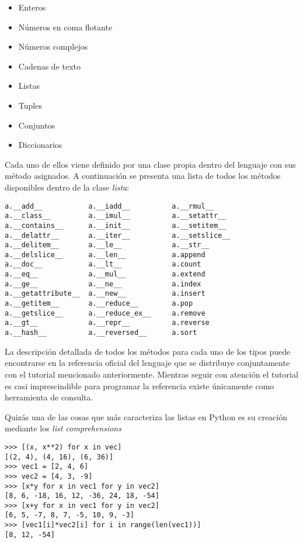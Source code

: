 \documentclass[a4paper,10pt]{article}
\begin{document}
\begin{itemize}
\item Enteros
\item Números en coma flotante
\item Números complejos
\item Cadenas de texto
\item Listas
\item Tuples
\item Conjuntos
\item Diccionarios
\end{itemize}

Cada uno de ellos viene definido por una clase propia dentro del
lenguaje con sus método asignados.  A continuación se presenta una
lista de todos los métodos disponibles dentro de la clase
\emph{lista}:

\begin{lstlisting}
a.__add__           a.__iadd__          a.__rmul__
a.__class__         a.__imul__          a.__setattr__
a.__contains__      a.__init__          a.__setitem__
a.__delattr__       a.__iter__          a.__setslice__
a.__delitem__       a.__le__            a.__str__
a.__delslice__      a.__len__           a.append
a.__doc__           a.__lt__            a.count
a.__eq__            a.__mul__           a.extend
a.__ge__            a.__ne__            a.index
a.__getattribute__  a.__new__           a.insert
a.__getitem__       a.__reduce__        a.pop
a.__getslice__      a.__reduce_ex__     a.remove
a.__gt__            a.__repr__          a.reverse
a.__hash__          a.__reversed__      a.sort
\end{lstlisting}

La descripción detallada de todos los métodos para cada uno de los
tipos puede encontrarse en la referencia oficial del lenguaje
\cite{REF} que se distribuye conjuntamente con el tutorial mencionado
anteriormente.  Mientras seguir con atención el tutorial es casi
imprescindible para programar la referencia existe únicamente como
herramienta de consulta.

Quizás una de las cosas que más caracteriza las listas en Python es su
creación mediante los \emph{list comprehensions}

\begin{lstlisting}
>>> [(x, x**2) for x in vec]
[(2, 4), (4, 16), (6, 36)]
>>> vec1 = [2, 4, 6]
>>> vec2 = [4, 3, -9]
>>> [x*y for x in vec1 for y in vec2]
[8, 6, -18, 16, 12, -36, 24, 18, -54]
>>> [x+y for x in vec1 for y in vec2]
[6, 5, -7, 8, 7, -5, 10, 9, -3]
>>> [vec1[i]*vec2[i] for i in range(len(vec1))]
[8, 12, -54]
\end{lstlisting}
\end{document}
